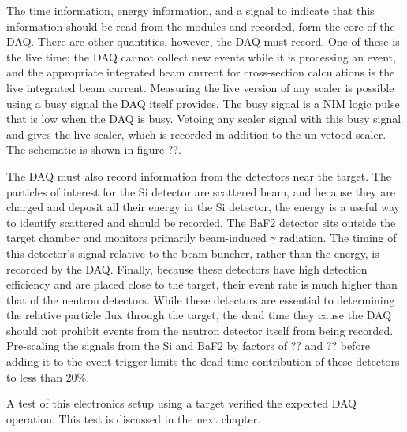 The time information, energy information, and a signal to indicate that this information should be read from the modules and recorded, form the core of the DAQ.  There are other quantities, however, the DAQ must record.  One of these is the live time; the DAQ cannot collect new events while it is processing an event, and the appropriate integrated beam current for cross-section calculations is the live integrated beam current.  Measuring the live version of any scaler is possible using a busy signal the DAQ itself provides.  The busy signal is a NIM logic pulse that is low when the DAQ is busy.  Vetoing any scaler signal with this busy signal and gives the live scaler, which is recorded in addition to the un-vetoed scaler.  The schematic is shown in figure ??.

The DAQ must also record information from the detectors near the target.  The particles of interest for the Si detector are scattered  beam, and because they are charged and deposit all their energy in the Si detector, the energy is a useful way to identify scattered  and should be recorded.  The BaF2 detector sits outside the target chamber and monitors primarily beam-induced $\gamma$ radiation.  The timing of this detector's signal relative to the beam buncher, rather than the energy, is recorded by the DAQ.  Finally, because these detectors have high detection efficiency and are placed close to the target, their event rate is much higher than that of the neutron detectors.  While these detectors are essential to determining the relative particle flux through the target, the dead time they cause the DAQ should not prohibit events from the neutron detector itself from being recorded.  Pre-scaling the signals from the Si and BaF2 by factors of ?? and ?? before adding it to the event trigger limits the dead time contribution of these detectors to less than 20\%.

A test of this electronics setup using a  target verified the expected DAQ operation.  This test is discussed in the next chapter. 

%
% 
% 
